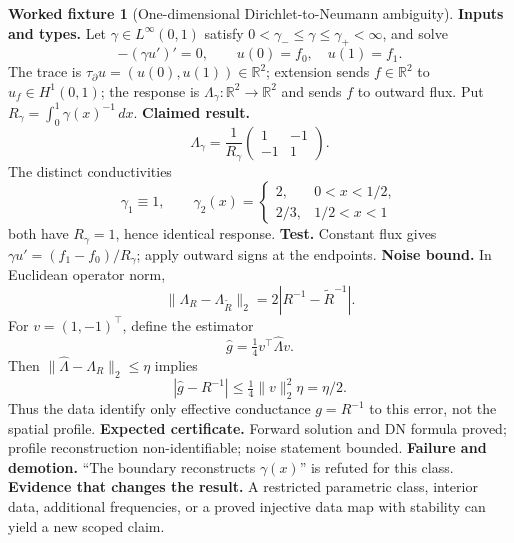 \documentclass[11pt,a4paper]{article}
\theoremstyle{definition}
\newtheorem{fixture}[definition]{Worked fixture}
\theoremstyle{plain}
\theoremstyle{remark}
\begin{document}
\begin{fixture}[One-dimensional Dirichlet-to-Neumann ambiguity]
\label{fix:pde}
\textbf{Inputs and types.}
Let \(\gamma\in L^\infty(0,1)\) satisfy
\(0<\gamma_-\le\gamma\le\gamma_+<\infty\), and solve
\[
-(\gamma u')'=0,\qquad u(0)=f_0,\quad u(1)=f_1.
\]
The trace is \(\tau_\partial u=(u(0),u(1))\in\mathbb R^2\); extension sends
\(f\in\mathbb R^2\) to \(u_f\in H^1(0,1)\); the response is
\(\Lambda_\gamma:\mathbb R^2\to\mathbb R^2\) and sends \(f\) to outward
flux.
Put \(R_\gamma=\int_0^1\gamma(x)^{-1}\,dx\).
\textbf{Claimed result.}
\[
\Lambda_\gamma=\frac1{R_\gamma}
\begin{pmatrix}1&-1\\-1&1\end{pmatrix}.
\]
The distinct conductivities
\[
\gamma_1\equiv1,\qquad
\gamma_2(x)=
\begin{cases}
2,&0<x<1/2,\\
2/3,&1/2<x<1
\end{cases}
\]
both have \(R_\gamma=1\), hence identical response.
\textbf{Test.}  Constant flux gives
\(\gamma u'=(f_1-f_0)/R_\gamma\); apply outward signs at the endpoints.
\textbf{Noise bound.}  In Euclidean operator norm,
\[
\|\Lambda_R-\Lambda_{\widetilde R}\|_2
=2|R^{-1}-\widetilde R^{-1}|.
\]
For \(v=(1,-1)^\top\), define the estimator
\[
\widehat g=\tfrac14v^\top\widehat\Lambda v .
\]
Then \(\|\widehat\Lambda-\Lambda_R\|_2\le\eta\) implies
\[
|\widehat g-R^{-1}|
\le\tfrac14\|v\|_2^2\eta=\eta/2.
\]
Thus the data identify only effective conductance \(g=R^{-1}\) to this error,
not the spatial profile.
\textbf{Expected certificate.}  Forward solution and DN formula proved;
profile reconstruction non-identifiable; noise statement bounded.
\textbf{Failure and demotion.}  ``The boundary reconstructs \(\gamma(x)\)''
is refuted for this class.  \textbf{Evidence that changes the result.}  A
restricted parametric class, interior data, additional frequencies, or a
proved injective data map with stability can yield a new scoped claim.
\end{fixture}
\end{document}
